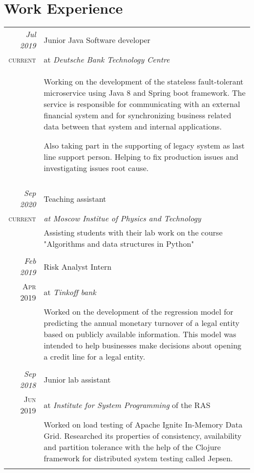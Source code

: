 \documentclass[a4paper,10pt]{article}
\begin{document}
\section{Work Experience}
\begin{tabular}{r|p{11cm}}

 \emph{Jul 2019} & Junior Java Software developer\\\textsc{current}&at \emph{Deutsche Bank Technology Centre}\\&\footnotesize{Working on the development of the stateless fault-tolerant microservice using Java 8 and Spring boot framework. The service is responsible for communicating with an external financial system and for synchronizing business related data between that system and internal applications.
 
 Also taking part in the supporting of legacy system as last line support person. Helping to fix production issues and investigating issues root cause.
 }\\\multicolumn{2}{c}{} \\
 
 \emph{Sep 2020} & Teaching assistant\\\textsc{current}&\emph{at Moscow Institue of Physics and Technology}\\&\footnotesize{Assisting students with their lab work on the course "Algorithms and data structures in Python"
 }\\\multicolumn{2}{c}{} \\
 
 \emph{Feb 2019} & Risk Analyst Intern\\\textsc{Apr 2019}&at \emph{Tinkoff bank}\\&\footnotesize{Worked on the development of the regression model for predicting the annual monetary turnover of a legal entity based on publicly available information. This model was intended to help businesses make decisions about opening a credit line for a legal entity.
 }\\\multicolumn{2}{c}{} \\

 \emph{Sep 2018} & Junior lab assistant \\\textsc{Jun 2019}&at \emph{Institute for System Programming} of the RAS\\&\footnotesize{Worked on load testing of Apache Ignite In-Memory Data Grid. Researched its properties of consistency, availability and partition tolerance with the help of the Clojure framework for distributed system testing called Jepsen.
 }\\\multicolumn{2}{c}{} \\
 
\end{tabular}
\end{document}
